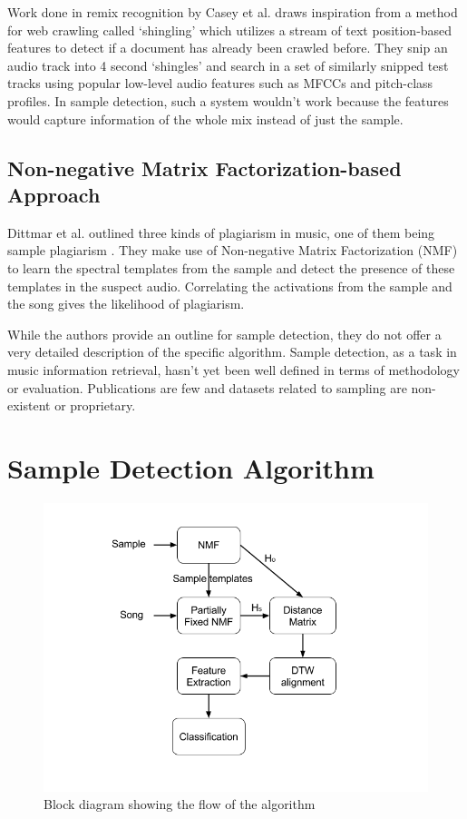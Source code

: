 \documentclass{article}
\begin{document}
Work done in remix recognition by Casey et al. \cite{caseyRemix} draws inspiration from a method for web crawling called `shingling' which utilizes a stream of text position-based features to detect if a document has already been crawled before. They snip an audio track into 4 second `shingles' and search in a set of similarly snipped test tracks using popular low-level audio features such as MFCCs and pitch-class profiles. In sample detection, such a system wouldn't work because the features would capture information of the whole mix instead of just the sample.

\subsection{Non-negative Matrix Factorization-based Approach}

Dittmar et al. outlined three kinds of plagiarism in music, one of them being sample plagiarism \cite{dittmar2012audio}. They make use of Non-negative Matrix Factorization (NMF) to learn the spectral templates from the sample and detect the presence of these templates in the suspect audio. Correlating the activations from the sample and the song gives the likelihood of plagiarism.

While the authors provide an outline for sample detection, they do not offer a very detailed description of the specific algorithm. Sample detection, as a task in music information retrieval, hasn't yet been well defined in terms of methodology or evaluation. Publications are few and datasets related to sampling are non-existent or proprietary.


\section{Sample Detection Algorithm}
\label{algo}

\begin{figure}[h!]
\centering
\includegraphics[width=\linewidth]{block_diagram.png}
\caption{Block diagram showing the flow of the algorithm}
\label{fig_block}
\end{figure}
\end{document}
